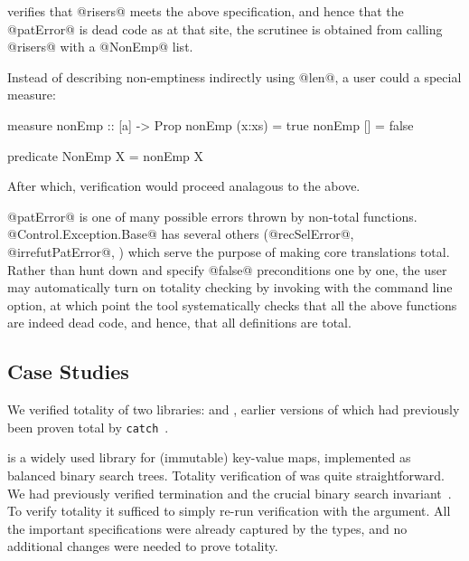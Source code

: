 \toolname verifies that @risers@ meets the above specification, 
and hence that the @patError@ is dead code as at that 
site, the scrutinee is obtained from calling @risers@ with a
@NonEmp@ list.

Instead of describing non-emptiness indirectly using @len@, a 
user could a special measure:
%
\begin{code}
  measure nonEmp  :: [a] -> Prop
  nonEmp (x:xs)   = true
  nonEmp []       = false

  predicate NonEmp X = nonEmp X
\end{code}
%
After which, verification would proceed analagous to the above.

@patError@ is one of many possible errors thrown by non-total functions.  
@Control.Exception.Base@ has several others (@recSelError@, @irrefutPatError@, \etc) which serve the purpose of making 
core translations total.
%
Rather than hunt down and specify @false@ preconditions one
by one, the user may automatically turn on totality checking 
by invoking \toolname with the \cmdtotality command line option, 
at which point the tool systematically checks that all the above 
functions are indeed dead code, and hence, that all definitions are total.

\subsection{Case Studies}

We verified totality of two libraries: \lbhscolour and \lbmap, earlier versions
of which had previously been proven total by \texttt{catch}~\citep{catch}.

\mypara{\lbmap} 
is a widely used library for (immutable) key-value maps, implemented
as balanced binary search trees.
Totality verification of \lbmap was quite straightforward.
We had previously verified termination and the crucial 
binary search invariant~\citep{vazou13}. To verify 
totality it sufficed to simply re-run verification with
the \cmdtotality argument.
%
All the important specifications were already captured by the types, 
and no additional changes were needed to prove totality.
%
%

